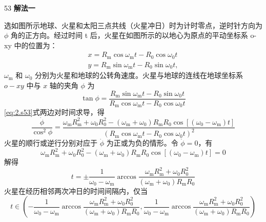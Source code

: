 \begin{solution}{53}
\textbf{解法一}

选如图所示地球、火星和太阳三点共线（火星冲日）时为计时零点，逆时针方向为 $\phi$ 角的正方向。经过时间 t 后，火星在如图所示的以地心为原点的平动坐标系 o-xy 中的位置为：
\begin{equation}
\begin{array}{l}
x = R_{\mathrm{m}}\cos\omega_{\mathrm{m}}t - R_{0}\cos\omega_{0}t \\
y = R_{\mathrm{m}}\sin\omega_{\mathrm{m}}t - R_{0}\sin\omega_{0}t,
\end{array}
\label{eq:1.s53}
\end{equation}
$\omega_{\mathrm{m}}$ 和 $\omega_0$ 分别为火星和地球的公转角速度。火星与地球的连线在地球坐标系 $o - xy$ 中与 $x$ 轴的夹角 $\phi$ 为
\begin{equation}
\tan\phi = \frac{R_{\mathrm{m}}\sin\omega_{\mathrm{m}}t - R_{0}\sin\omega_{0}t}{R_{\mathrm{m}}\cos\omega_{\mathrm{m}}t - R_{0}\cos\omega_{0}t}
\label{eq:2.s53}
\end{equation}
\eqref{eq:2.s53}式两边对时间求导，得
\begin{equation}
\frac{\dot{\phi}}{\cos^{2}\phi} = \frac{\omega_{\mathrm{m}}R_{\mathrm{m}}^{2} + \omega_{0}R_{0}^{2} - (\omega_{\mathrm{m}}+\omega_{0})R_{\mathrm{m}}R_{0}\cos[(\omega_{0}-\omega_{\mathrm{m}})t]}{(R_{\mathrm{m}}\cos\omega_{\mathrm{m}}t - R_{0}\cos\omega_{0}t)^{2}}
\label{eq:3.s53}
\end{equation}
火星的顺行或逆行分别对应于 $\dot{\phi}$ 为正或为负的情形。令 $\dot{\phi}=0$，有
\begin{equation}
\omega_{\mathrm{m}}R_{\mathrm{m}}^{2} + \omega_{0}R_{0}^{2} - (\omega_{\mathrm{m}}+\omega_{0})R_{\mathrm{m}}R_{0}\cos[(\omega_{0}-\omega_{\mathrm{m}})t] = 0
\label{eq:4.s53}
\end{equation}
解得
\begin{equation}
t = \pm\frac{1}{\omega_{0}-\omega_{\mathrm{m}}}\arccos\frac{\omega_{\mathrm{m}}R_{\mathrm{m}}^{2}+\omega_{0}R_{0}^{2}}{(\omega_{\mathrm{m}}+\omega_{0})R_{\mathrm{m}}R_{0}}
\label{eq:5.s53}
\end{equation}
火星在经历相邻两次冲日的时间间隔内，仅当
\begin{equation}
t \in \left(-\frac{1}{\omega_{0}-\omega_{\mathrm{m}}}\arccos\frac{\omega_{\mathrm{m}}R_{\mathrm{m}}^{2}+\omega_{0}R_{0}^{2}}{(\omega_{\mathrm{m}}+\omega_{0})R_{\mathrm{m}}R_{0}}, \frac{1}{\omega_{0}-\omega_{\mathrm{m}}}\arccos\frac{\omega_{\mathrm{m}}R_{\mathrm{m}}^{2}+\omega_{0}R_{0}^{2}}{(\omega_{\mathrm{m}}+\omega_{0})R_{\mathrm{m}}R_{0}}\right)

\end{equation}
\end{solution}
